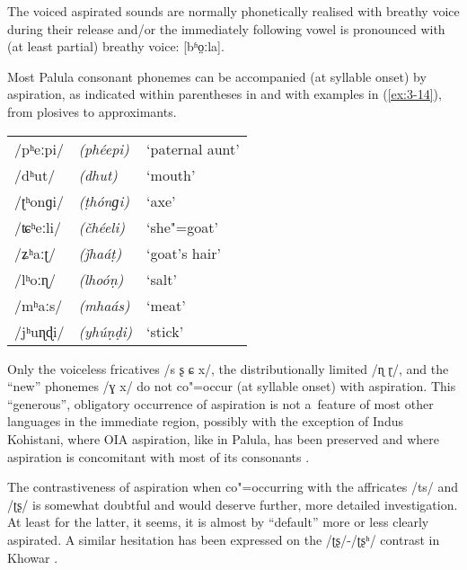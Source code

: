 The voiced aspirated sounds are normally phonetically realised with breathy voice during their release and/or the immediately following vowel is pronounced with (at least partial) breathy voice: [bʱo̤ːla].


Most Palula consonant phonemes can be accompanied (at syllable onset) by aspiration, as indicated within parentheses in  and with examples in (\ref{ex:3-14}), from plosives to approximants. 


\begin{exe}
\extab
\label{ex:3-14}
\begin{tabularx}{\textwidth}{ l l l }
/pʰeːpi/ &
\textit{(phéepi)} &
`paternal aunt'\\
/dʰut/ &
\textit{(dhut)} &
`mouth'\\
/ʈʰonɡi/ &
\textit{(ṭhónɡi)} &
`axe'\\
/ʨʰeːli/ &
\textit{(čhéeli)} &
`she"=goat'\\
/ʑʰaːʈ/ &
\textit{(ǰhaáṭ)} &
`goat's hair'\\
/lʰoːɳ/ &
\textit{(lhoóṇ) } &
`salt'\\
/mʰaːs/ &
\textit{(mhaás)} &
`meat'\\
/jʰuɳɖi/ &
\textit{(yhúṇḍi)} &
`stick'\\
\end{tabularx}
\end{exe}


Only the voiceless fricatives /s ʂ ɕ x/, the distributionally limited /ɳ ɽ/, and the ``new'' phonemes /ɣ x/ do not co"=occur (at syllable onset) with aspiration. This ``generous'', obligatory occurrence of aspiration is not a~feature of most other languages in the immediate region, possibly with the exception of Indus Kohistani, where OIA aspiration, like in Palula, has been preserved and where aspiration is concomitant with most of its consonants \citep[19--25]{hallberghallberg1999}. 


The contrastiveness of aspiration when co"=occurring with the affricates /ts/ and /ʈʂ/ is somewhat doubtful and would deserve further, more detailed investigation. At least for the latter, it seems, it is almost by ``default'' more or less clearly aspirated. A similar hesitation has been expressed on the /ʈʂ/-/ʈʂʰ/ contrast in Khowar \citep[239]{endresenkristiansen1981}.


